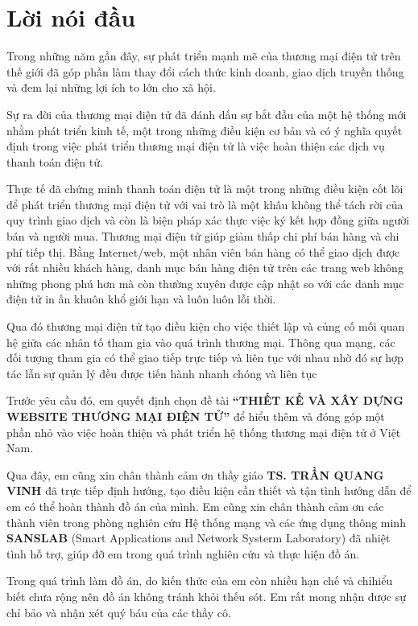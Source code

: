 \thispagestyle{plain}
\chapter*{Lời nói đầu}
Trong những năm gần đây, sự phát triển mạnh mẽ của thương mại điện tử trên thế giới đã góp phần làm thay đổi cách thức kinh doanh, giao dịch truyền thống và đem lại những lợi ích to lớn cho xã hội.
\par
Sự ra đời của thương mại điện tử đã đánh dấu sự bắt đầu của một hệ thống mới nhằm phát triển kinh tế, một trong những điều kiện cơ bản và có ý nghĩa quyết định trong việc phát triển thương mại điện tử là việc hoàn thiện các dịch vụ thanh toán điện tử.
\par 
Thực tế đã chứng minh thanh toán điện tử là một trong những điều kiện cốt lõi để phát triển thương mại điện tử với vai trò là một khâu không thể tách rời của quy trình giao dịch và còn là biện pháp xác thực việc ký kết hợp đồng giữa người bán và người mua. Thương mại điện tử giúp giảm thấp chi phí bán hàng và chi phí tiếp thị. Bằng Internet/web, một nhân viên bán hàng có thể giao dịch được với rất nhiều khách hàng, danh mục bán hàng điện tử trên các trang web không những phong phú hơn mà còn thường xuyên được cập nhật so với các danh mục điện tử in ấn khuôn khổ giới hạn và luôn luôn lỗi thời.
\par
Qua đó thương mại điện tử tạo điều kiện cho việc thiết lập và củng cố mối quan hệ giữa các nhân tố tham gia vào quá trình thương mại. Thông qua mạng, các đối tượng tham gia có thể giao tiếp trực tiếp và liên tục với nhau nhờ đó sự hợp tác lẫn sự
quản lý đều được tiến hành nhanh chóng và liên tục
\par 
Trước yêu cầu đó, em quyết định chọn đề tài \textbf{“THIẾT KẾ VÀ XÂY DỰNG WEBSITE THƯƠNG MẠI ĐIỆN TỬ”} để hiểu thêm và đóng góp một phần nhỏ vào việc hoàn thiện và phát triển hệ thống thương mại điện tử ở Việt Nam.
\par
Qua đây, em cũng xin chân thành cảm ơn thầy giáo \textbf{TS. TRẦN QUANG VINH} đã trực tiếp định hướng, tạo điều kiện cần thiết và tận tình hướng dẫn để em có thể hoàn thành đồ án của mình. Em cũng xin chân thành cảm ơn các thành viên trong phòng nghiên cứu Hệ thống mạng và các ứng dụng thông minh \textbf{SANSLAB} (Smart Applications and Network Systerm Laboratory) đã nhiệt tình hỗ trợ, giúp đỡ em trong quá trình nghiên cứu và thực hiện đồ án.
\par
Trong quá trình làm đồ án, do kiến thức của em còn nhiều hạn chế và chỉhiểu biết chưa rộng nên đồ án không tránh khỏi thếu sót. Em rất mong nhận được sự chỉ bảo và nhận xét quý báu của các thầy cô.
